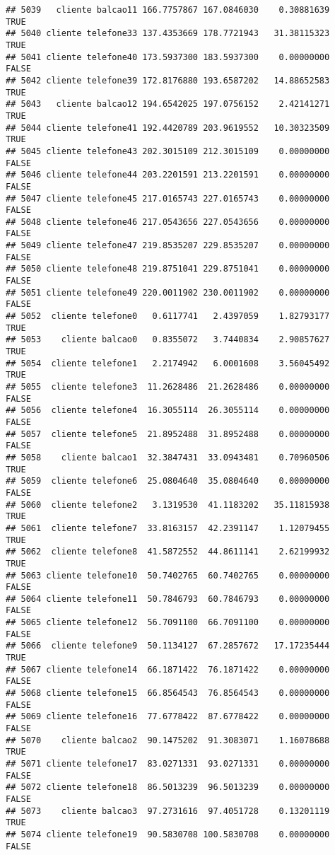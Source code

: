 \documentclass[
]{article}
\begin{document}
\begin{verbatim}
## 5039   cliente balcao11 166.7757867 167.0846030    0.30881639     TRUE
## 5040 cliente telefone33 137.4353669 178.7721943   31.38115323     TRUE
## 5041 cliente telefone40 173.5937300 183.5937300    0.00000000    FALSE
## 5042 cliente telefone39 172.8176880 193.6587202   14.88652583     TRUE
## 5043   cliente balcao12 194.6542025 197.0756152    2.42141271     TRUE
## 5044 cliente telefone41 192.4420789 203.9619552   10.30323509     TRUE
## 5045 cliente telefone43 202.3015109 212.3015109    0.00000000    FALSE
## 5046 cliente telefone44 203.2201591 213.2201591    0.00000000    FALSE
## 5047 cliente telefone45 217.0165743 227.0165743    0.00000000    FALSE
## 5048 cliente telefone46 217.0543656 227.0543656    0.00000000    FALSE
## 5049 cliente telefone47 219.8535207 229.8535207    0.00000000    FALSE
## 5050 cliente telefone48 219.8751041 229.8751041    0.00000000    FALSE
## 5051 cliente telefone49 220.0011902 230.0011902    0.00000000    FALSE
## 5052  cliente telefone0   0.6117741   2.4397059    1.82793177     TRUE
## 5053    cliente balcao0   0.8355072   3.7440834    2.90857627     TRUE
## 5054  cliente telefone1   2.2174942   6.0001608    3.56045492     TRUE
## 5055  cliente telefone3  11.2628486  21.2628486    0.00000000    FALSE
## 5056  cliente telefone4  16.3055114  26.3055114    0.00000000    FALSE
## 5057  cliente telefone5  21.8952488  31.8952488    0.00000000    FALSE
## 5058    cliente balcao1  32.3847431  33.0943481    0.70960506     TRUE
## 5059  cliente telefone6  25.0804640  35.0804640    0.00000000    FALSE
## 5060  cliente telefone2   3.1319530  41.1183202   35.11815938     TRUE
## 5061  cliente telefone7  33.8163157  42.2391147    1.12079455     TRUE
## 5062  cliente telefone8  41.5872552  44.8611141    2.62199932     TRUE
## 5063 cliente telefone10  50.7402765  60.7402765    0.00000000    FALSE
## 5064 cliente telefone11  50.7846793  60.7846793    0.00000000    FALSE
## 5065 cliente telefone12  56.7091100  66.7091100    0.00000000    FALSE
## 5066  cliente telefone9  50.1134127  67.2857672   17.17235444     TRUE
## 5067 cliente telefone14  66.1871422  76.1871422    0.00000000    FALSE
## 5068 cliente telefone15  66.8564543  76.8564543    0.00000000    FALSE
## 5069 cliente telefone16  77.6778422  87.6778422    0.00000000    FALSE
## 5070    cliente balcao2  90.1475202  91.3083071    1.16078688     TRUE
## 5071 cliente telefone17  83.0271331  93.0271331    0.00000000    FALSE
## 5072 cliente telefone18  86.5013239  96.5013239    0.00000000    FALSE
## 5073    cliente balcao3  97.2731616  97.4051728    0.13201119     TRUE
## 5074 cliente telefone19  90.5830708 100.5830708    0.00000000    FALSE

\end{verbatim}
\end{document}
